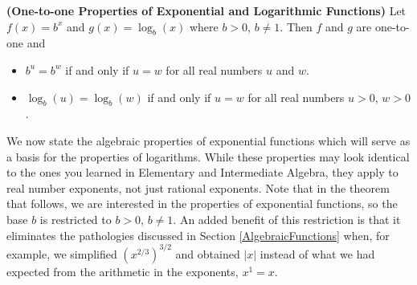 \smallskip

\colorbox{ResultColor}{\bbm

\begin{thm}  \label{explogsonetoone} \textbf{(One-to-one Properties of Exponential and Logarithmic Functions)} Let $f(x) = b^{x}$ and $g(x) = \log_{b}(x)$ where $b>0$, $b\neq 1$.  Then $f$ and $g$ are one-to-one and  

\vspace{-.1in}

\begin{itemize}

\item  $b^{u} = b^{w}$ if and only if $u=w$ for all real numbers $u$ and $w$.

\item  $\log_{b}(u) = \log_{b}(w)$ if and only if $u=w$ for all real numbers $u > 0$, $w > 0$.

\end{itemize}

\end{thm}

\ebm}

\smallskip

We now state the algebraic properties of exponential functions which will serve as a basis for the properties of logarithms.  While these properties may look identical to the ones you learned in Elementary and Intermediate Algebra, they apply to real number exponents, not just rational exponents.  Note that in the theorem that follows, we are interested in the properties of exponential functions, so the base $b$ is restricted to $b > 0$, $b \neq 1$.  An added benefit of this restriction is that it eliminates the pathologies discussed in Section \ref{AlgebraicFunctions} when, for example, we simplified $\left(x^{2/3}\right)^{3/2}$ and obtained $|x|$ instead of what we had expected from the arithmetic in the exponents, $x^{1} = x$. 

\smallskip

